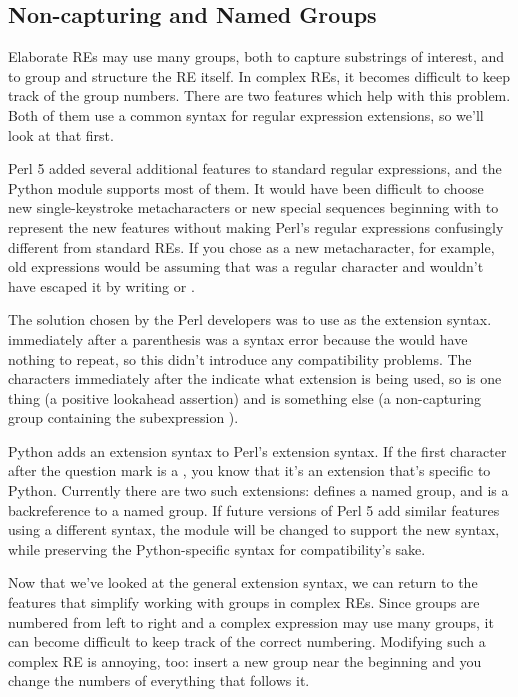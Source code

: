 \documentclass{howto}
\begin{document}
\subsection{Non-capturing and Named Groups}

Elaborate REs may use many groups, both to capture substrings of
interest, and to group and structure the RE itself.  In complex REs,
it becomes difficult to keep track of the group numbers.  There are
two features which help with this problem.  Both of them use a common
syntax for regular expression extensions, so we'll look at that first.

Perl 5 added several additional features to standard regular
expressions, and the Python  module supports most of them.  
It would have been difficult to choose new
single-keystroke metacharacters or new special sequences beginning
with \samp{\e} to represent the new features without making Perl's
regular expressions confusingly different from standard REs.  If you
chose \samp{\&} as a new metacharacter, for example, old expressions
would be assuming that
\samp{\&} was a regular character and wouldn't have escaped it by
writing \regexp{\e \&} or \regexp{[\&]}.  

The solution chosen by the Perl developers was to use 
as the extension syntax.   immediately after a parenthesis was
a syntax error because the  would have nothing to repeat, so
this didn't introduce any compatibility problems.  The characters
immediately after the   indicate what extension is being used,
so  is one thing (a positive lookahead assertion) and
 is something else (a non-capturing group containing
the subexpression ).

Python adds an extension syntax to Perl's extension syntax.  If the
first character after the question mark is a , you know that
it's an extension that's specific to Python.  Currently there are two
such extensions:  defines a named group,
and  is a backreference to a named group.  If
future versions of Perl 5 add similar features using a different
syntax, the  module will be changed to support the new
syntax, while preserving the Python-specific syntax for
compatibility's sake.

Now that we've looked at the general extension syntax, we can return
to the features that simplify working with groups in complex REs.
Since groups are numbered from left to right and a complex expression
may use many groups, it can become difficult to keep track of the
correct numbering.  Modifying such a complex RE is annoying, too:
insert a new group near the beginning and you change the numbers of
everything that follows it.
\end{document}
